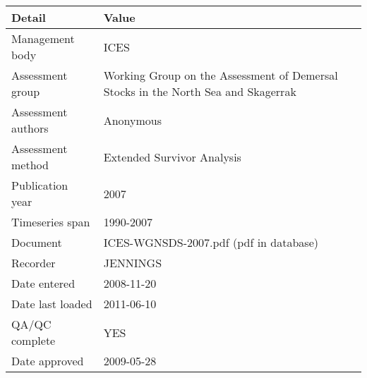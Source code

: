 \begin{table}[htb]
\centering
\begin{tabular}{lp{7cm}}
\toprule
Detail & Value \\
\midrule
Management body    & ICES                                                                              \\
Assessment group   & Working Group on the Assessment of Demersal Stocks in the North Sea and Skagerrak \\
Assessment authors & Anonymous                                                                         \\
Assessment method  & Extended Survivor Analysis                                                        \\
Publication year   & 2007                                                                              \\
Timeseries span    & 1990-2007                                                                         \\
Document           & ICES-WGNSDS-2007.pdf (pdf in database)                                            \\
Recorder           & JENNINGS                                                                          \\
Date entered       & 2008-11-20                                                                        \\
Date last loaded   & 2011-06-10                                                                        \\
QA/QC complete     & YES                                                                               \\
Date approved      & 2009-05-28                                                                        \\
\bottomrule
\end{tabular}
\label{tab:assessdet}
\end{table}
